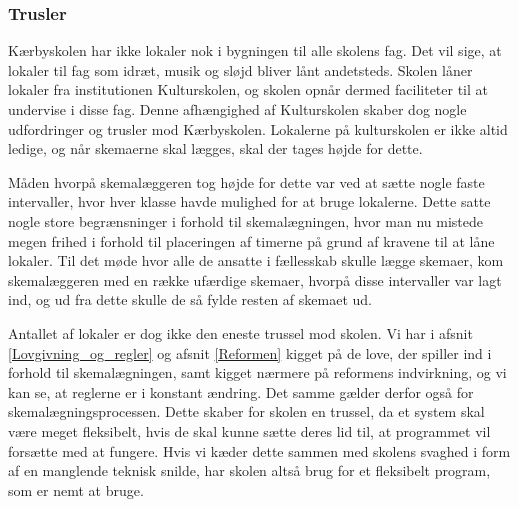 \subsubsection*{Trusler}
Kærbyskolen har ikke lokaler nok i bygningen til alle skolens fag. Det vil sige, at lokaler til fag som idræt, musik og sløjd bliver lånt andetsteds. Skolen låner lokaler fra institutionen Kulturskolen, og skolen opnår dermed faciliteter til at undervise i disse fag. Denne afhængighed af Kulturskolen skaber dog nogle udfordringer og trusler mod Kærbyskolen. Lokalerne på kulturskolen er ikke altid ledige, og når skemaerne skal lægges, skal der tages højde for dette. 

Måden hvorpå skemalæggeren tog højde for dette var ved at sætte nogle faste intervaller, hvor hver klasse havde mulighed for at bruge lokalerne. Dette satte nogle store begrænsninger i forhold til skemalægningen, hvor man nu mistede megen frihed i forhold til placeringen af timerne på grund af kravene til at låne lokaler. Til det møde hvor alle de ansatte i fællesskab skulle lægge skemaer, kom skemalæggeren med en række ufærdige skemaer, hvorpå disse intervaller var lagt ind, og ud fra dette skulle de så fylde resten af skemaet ud.  

Antallet af lokaler er dog ikke den eneste trussel mod skolen. Vi har i afsnit \ref{Lovgivning_og_regler} og afsnit \ref{Reformen} kigget på de love, der spiller ind i forhold til skemalægningen, samt kigget nærmere på reformens indvirkning, og vi kan se, at reglerne er i konstant ændring. Det samme gælder derfor også for skemalægningsprocessen. Dette skaber for skolen en trussel, da et system skal være meget fleksibelt, hvis de skal kunne sætte deres lid til, at programmet vil forsætte med at fungere. Hvis vi kæder dette sammen med skolens svaghed i form af en manglende teknisk snilde, har skolen altså brug for et fleksibelt program, som er nemt at bruge.
